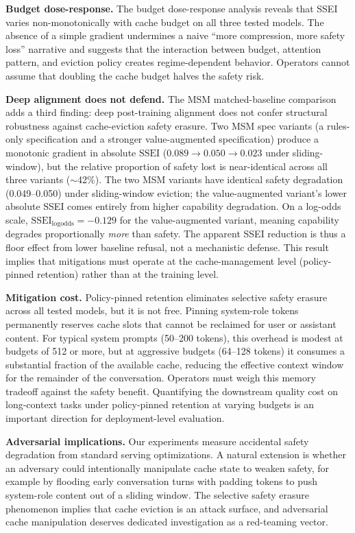 \documentclass{article}
\newcommand{\ssei}{\mathrm{SSEI}}
\begin{document}
\textbf{Budget dose-response.} The budget dose-response analysis reveals that SSEI varies non-monotonically with cache budget on all three tested models. The absence of a simple gradient undermines a naive ``more compression, more safety loss'' narrative and suggests that the interaction between budget, attention pattern, and eviction policy creates regime-dependent behavior. Operators cannot assume that doubling the cache budget halves the safety risk.

\textbf{Deep alignment does not defend.} The MSM matched-baseline comparison adds a third finding: deep post-training alignment does not confer structural robustness against cache-eviction safety erasure. Two MSM spec variants (a rules-only specification and a stronger value-augmented specification) produce a monotonic gradient in absolute $\ssei$ ($0.089 \to 0.050 \to 0.023$ under sliding-window), but the relative proportion of safety lost is near-identical across all three variants ($\sim$42\%). The two MSM variants have identical safety degradation (0.049--0.050) under sliding-window eviction; the value-augmented variant's lower absolute SSEI comes entirely from higher capability degradation. On a log-odds scale, $\ssei_{\mathrm{logodds}} = -0.129$ for the value-augmented variant, meaning capability degrades proportionally \emph{more} than safety. The apparent SSEI reduction is thus a floor effect from lower baseline refusal, not a mechanistic defense. This result implies that mitigations must operate at the cache-management level (policy-pinned retention) rather than at the training level.

\textbf{Mitigation cost.} Policy-pinned retention eliminates selective safety erasure across all tested models, but it is not free. Pinning system-role tokens permanently reserves cache slots that cannot be reclaimed for user or assistant content. For typical system prompts (50--200 tokens), this overhead is modest at budgets of 512 or more, but at aggressive budgets (64--128 tokens) it consumes a substantial fraction of the available cache, reducing the effective context window for the remainder of the conversation. Operators must weigh this memory tradeoff against the safety benefit. Quantifying the downstream quality cost on long-context tasks under policy-pinned retention at varying budgets is an important direction for deployment-level evaluation.

\textbf{Adversarial implications.} Our experiments measure accidental safety degradation from standard serving optimizations. A natural extension is whether an adversary could intentionally manipulate cache state to weaken safety, for example by flooding early conversation turns with padding tokens to push system-role content out of a sliding window. The selective safety erasure phenomenon implies that cache eviction is an attack surface, and adversarial cache manipulation deserves dedicated investigation as a red-teaming vector.
\end{document}
